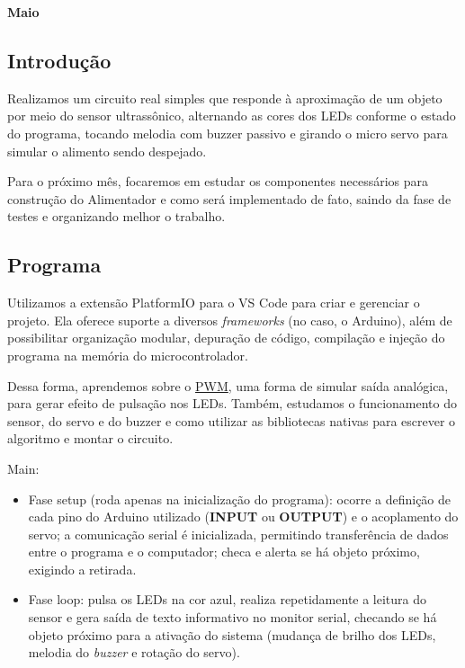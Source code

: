 \begin{center}
    \vspace{2cm} 
    {\Huge \bfseries Maio} \\ 
    \vspace{1cm} 
\end{center}

\subsection*{Introdução}
Realizamos um circuito real simples que responde à aproximação de um objeto por meio do sensor ultrassônico, alternando as cores dos LEDs conforme o estado do programa, tocando melodia com buzzer passivo e girando o micro servo para simular o alimento sendo despejado.

Para o próximo mês, focaremos em estudar os componentes necessários para construção do Alimentador e como será implementado de fato, saindo da fase de testes e organizando melhor o trabalho.
\subsection*{Programa}
Utilizamos a extensão PlatformIO para o VS Code para criar e gerenciar o projeto. Ela oferece suporte a diversos \textit{frameworks} (no caso, o Arduino), além de possibilitar organização modular, depuração de código, compilação e injeção do programa na memória do microcontrolador.

Dessa forma, aprendemos sobre o \href{https://www.youtube.com/watch?v=B_Ysdv1xRbA&t=8s}{PWM}, uma forma de simular saída analógica, para gerar efeito de pulsação nos LEDs. Também, estudamos o funcionamento do sensor, do servo e do buzzer e como utilizar as bibliotecas nativas para escrever o algoritmo e montar o circuito.
\bigbreak

Main: 
\begin{itemize}
    \item Fase setup (roda apenas na inicialização do programa):
    ocorre a definição de cada pino do Arduino utilizado (\textbf{INPUT} ou \textbf{OUTPUT}) e o acoplamento do servo; a comunicação serial é inicializada, permitindo transferência de dados entre o programa e o computador; checa e alerta se há objeto próximo, exigindo a retirada.
    \item Fase loop:
    pulsa os LEDs na cor azul, realiza repetidamente a leitura do sensor e gera saída de texto informativo no monitor serial, checando se há objeto próximo para a ativação do sistema (mudança de brilho dos LEDs, melodia do \textit{buzzer} e rotação do servo).
\end{itemize}

